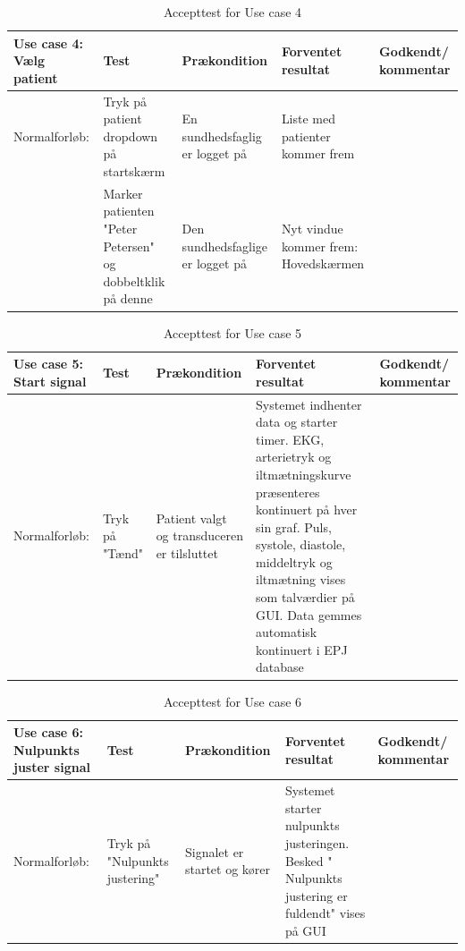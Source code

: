 \begin{table}[H]
\caption{Accepttest for Use case 4}\label{tab:tabel8}
\begin{tabular}{|>{\raggedright\arraybackslash}p{2.5cm}| >{\raggedright\arraybackslash}p{2.9cm} | >{\raggedright\arraybackslash}p{2.9cm} | >{\raggedright\arraybackslash}p{2.9cm} | >{\raggedright\arraybackslash}p{2.8cm} |}
   \hline
   \textbf{Use case 4: Vælg patient} &\textbf{Test}& \textbf{Prækondition} & \textbf{Forventet resultat} & \textbf{Godkendt/ kommentar}\\ \hline
   Normalforløb:& Tryk på patient dropdown på startskærm & En sundhedsfaglig er logget på & Liste med patienter kommer frem  & \\\hline
   & Marker patienten "Peter Petersen" og dobbeltklik på denne & Den sundhedsfaglige er logget på & Nyt vindue kommer frem: Hovedskærmen &\\\hline
\end{tabular}
\end{table}


\begin{table}[H]
\caption{Accepttest for Use case 5}\label{tab:tabel8}
\begin{tabular}{|>{\raggedright\arraybackslash}p{2.5cm}| >{\raggedright\arraybackslash}p{2.9cm} | >{\raggedright\arraybackslash}p{2.9cm} | >{\raggedright\arraybackslash}p{2.9cm} | >{\raggedright\arraybackslash}p{2.8cm} |}
   \hline
   \textbf{Use case 5: Start signal} &\textbf{Test}& \textbf{Prækondition} & \textbf{Forventet resultat} & \textbf{Godkendt/ kommentar}\\ \hline
   Normalforløb:& Tryk på "Tænd"& Patient valgt og transduceren er tilsluttet & Systemet indhenter data og starter timer. EKG, arterietryk og iltmætningskurve præsenteres kontinuert på hver sin graf. Puls, systole, diastole, middeltryk og iltmætning vises som talværdier på GUI. Data gemmes automatisk kontinuert i EPJ database & \\\hline
\end{tabular}
\end{table}

\begin{table}[H]
\caption{Accepttest for Use case 6}\label{tab:tabel8}
\begin{tabular}{|>{\raggedright\arraybackslash}p{2.5cm}| >{\raggedright\arraybackslash}p{2.9cm} | >{\raggedright\arraybackslash}p{2.9cm} | >{\raggedright\arraybackslash}p{2.9cm} | >{\raggedright\arraybackslash}p{2.8cm} |}
   \hline
   \textbf{Use case 6: Nulpunkts juster signal } &\textbf{Test}& \textbf{Prækondition} & \textbf{Forventet resultat} & \textbf{Godkendt/ kommentar}\\ \hline
   Normalforløb:& Tryk på "Nulpunkts justering" & Signalet er startet og kører & Systemet starter nulpunkts justeringen. Besked " Nulpunkts justering er fuldendt" vises på GUI &\\\hline
\end{tabular}
\end{table}



